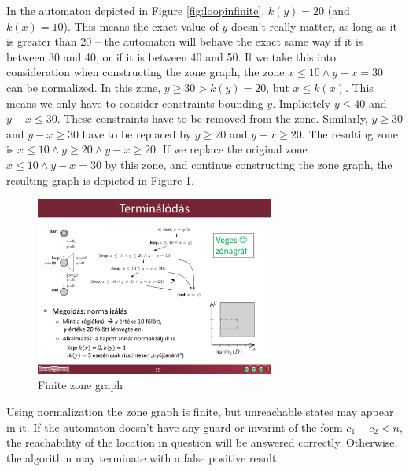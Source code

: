 \begin{example}
In the automaton depicted in Figure \ref{fig:loopinfinite}, $k(y)=20$ (and $k(x)=10$). This means the exact value of $y$ doesn't really matter, as long as it is greater than 20 -- the automaton will behave the exact same way if it is between 30 and 40, or if it is between 40 and 50. %
If we take this into consideration when constructing the zone graph, the zone  $x \leq 10 \wedge y-x=30$ can be normalized. In this zone, $y \geq 30 > k(y)=20$, but $x \leq k(x)$. This means we only have to consider constraints bounding $y$.
Implicitely $y \leq 40$ and $y-x \leq 30$. These constraints have to be removed from the zone. Similarly, $y \geq 30$ and $y-x \geq 30$ have to be replaced by $y \geq 20$ and $y-x \geq 20$. The resulting zone is $x \leq 10 \wedge y \geq 20 \wedge y-x \geq 20$. If we replace the original zone  $x \leq 10 \wedge y-x=30$ by this zone, and continue constructing the zone graph, the resulting graph is depicted in Figure \ref{fig:looprealgraph}.

\end{example}

\begin{figure}
	\centering
	\includegraphics [width=0.7\textwidth] {include/figures/loop_real_zonegraph}%
			\vspace*{4pt}%
	\caption{Finite zone graph}
	\label{fig:looprealgraph}
\end{figure}

Using normalization the zone graph is finite, but unreachable states may appear in it. If the automaton doesn't have any guard or invarint of the form $c_1 - c_2 < n$, the reachability of the location in question will be answered correctly. Otherwise, the algorithm may terminate with a false positive result.

